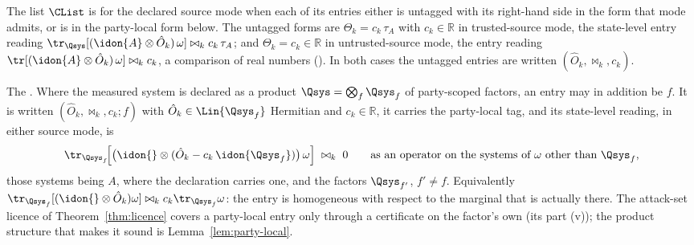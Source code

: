 
\begin{definition}\label{def:licensed}
The list $\CList$ is
for the declared source mode when each of its entries either is untagged
with its right-hand side in the form that mode admits, or is in the
party-local form below. The untagged forms are $\Theta_k=c_k\,\tau_A$ with
$c_k\in\mathbb{R}$ in trusted-source mode, the state-level entry reading
$\tr_{\Qsys}[(\idon{A}\otimes\hat O_k)\,\omega]\bowtie_kc_k\,\tau_A$; and
$\Theta_k=c_k\in\mathbb{R}$ in untrusted-source mode, the entry reading
$\tr[(\idon{A}\otimes\hat O_k)\,\omega]\bowtie_kc_k$, a comparison of real
numbers (). In both cases the untagged
entries are written $(\hat O_k,\bowtie_k,c_k)$.

The
.
Where the measured system is declared as a product
$\Qsys=\bigotimes_{f}\Qsys_f$ of party-scoped factors, an entry may in
addition be
$f$. It is written $(\hat O_k,\bowtie_k,c_k;f)$ with
$\hat O_k\in\Lin{\Qsys_f}$ Hermitian and $c_k\in\mathbb{R}$, it carries the
party-local tag, and its state-level reading, in either source mode, is
\begin{equation}\label{eq:partylocal-entry}
  \tr_{\Qsys_f}\!\Big[\big(\idon{}\otimes(\hat O_k-c_k\,\idon{\Qsys_f})\big)
  \,\omega\Big]\;\bowtie_k\;0
  \qquad\text{as an operator on the systems of }\omega\text{ other than }
  \Qsys_f ,
\end{equation}
those systems being $A$, where the declaration carries one, and the factors
$\Qsys_{f'}$, $f'\ne f$. Equivalently
$\tr_{\Qsys_f}[(\idon{}\otimes\hat O_k)\omega]\bowtie_kc_k\tr_{\Qsys_f}\omega$:
the entry is homogeneous with respect to the marginal that is actually
there. The attack-set licence of Theorem~\ref{thm:licence} covers a
party-local entry only through a certificate on the factor's own
 (its part (v)); the product structure that makes it
sound is Lemma~\ref{lem:party-local}.


\end{definition}
